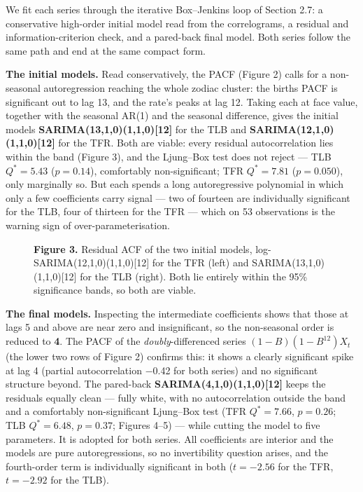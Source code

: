 \documentclass[
  11pt,
]{article}
\makeatletter
\newcommand*\pandocbounded[1]{%
  \sbox\pandoc@box{#1}%
  \Gscale@div\@tempa{\textheight}{\dimexpr\ht\pandoc@box+\dp\pandoc@box\relax}%
  \Gscale@div\@tempb{\linewidth}{\wd\pandoc@box}%
  \ifdim\@tempb\p@<\@tempa\p@\let\@tempa\@tempb\fi%
  \ifdim\@tempa\p@<\p@\scalebox{\@tempa}{\usebox\pandoc@box}%
  \else\usebox{\pandoc@box}%
  \fi%
}
\renewcommand*\pandocbounded[1]{%
  \sbox\pandoc@box{#1}%
  \Gscale@div\@tempa{\linewidth}{\wd\pandoc@box}%
  \ifdim\@tempa\p@<\p@\scalebox{\@tempa}{\usebox\pandoc@box}%
  \else\usebox{\pandoc@box}%
  \fi%
}
\makeatother
\begin{document}
We fit each series through the iterative Box--Jenkins loop of Section
2.7: a conservative high-order initial model read from the correlograms,
a residual and information-criterion check, and a pared-back final
model. Both series follow the same path and end at the same compact
form.

\textbf{The initial models.} Read conservatively, the PACF (Figure 2)
calls for a non-seasonal autoregression reaching the whole zodiac
cluster: the births PACF is significant out to lag 13, and the rate's
peaks at lag 12. Taking each at face value, together with the seasonal
AR(1) and the seasonal difference, gives the initial models
\textbf{SARIMA(13,1,0)(1,1,0){[}12{]}} for the TLB and
\textbf{SARIMA(12,1,0)(1,1,0){[}12{]}} for the TFR. Both are viable:
every residual autocorrelation lies within the band (Figure 3), and the
Ljung--Box test does not reject --- TLB \(Q^* = 5.43\) (\(p = 0.14\)),
comfortably non-significant; TFR \(Q^* = 7.81\) (\(p = 0.050\)), only
marginally so. But each spends a long autoregressive polynomial in which
only a few coefficients carry signal --- two of fourteen are
individually significant for the TLB, four of thirteen for the TFR ---
which on 53 observations is the warning sign of over-parameterisation.

\begin{figure}
\centering
\pandocbounded{\includegraphics[keepaspectratio,alt={Figure 3. Residual ACF of the two initial models, log-SARIMA(12,1,0)(1,1,0){[}12{]} for the TFR (left) and SARIMA(13,1,0)(1,1,0){[}12{]} for the TLB (right). Both lie entirely within the 95\% significance bands, so both are viable.}]{figures/fr2_fig3_initial_resid_acf.png}}
\caption{\textbf{Figure 3.} Residual ACF of the two initial models,
log-SARIMA(12,1,0)(1,1,0){[}12{]} for the TFR (left) and
SARIMA(13,1,0)(1,1,0){[}12{]} for the TLB (right). Both lie entirely
within the 95\% significance bands, so both are viable.}
\end{figure}

\textbf{The final models.} Inspecting the intermediate coefficients
shows that those at lags 5 and above are near zero and insignificant, so
the non-seasonal order is reduced to \textbf{4}. The PACF of the
\emph{doubly}-differenced series \((1-B)(1-B^{12})X_t\) (the lower two
rows of Figure 2) confirms this: it shows a clearly significant spike at
lag 4 (partial autocorrelation −0.42 for both series) and no significant
structure beyond. The pared-back \textbf{SARIMA(4,1,0)(1,1,0){[}12{]}}
keeps the residuals equally clean --- fully white, with no
autocorrelation outside the band and a comfortably non-significant
Ljung--Box test (TFR \(Q^* = 7.66\), \(p = 0.26\); TLB \(Q^* = 6.48\),
\(p = 0.37\); Figures 4--5) --- while cutting the model to five
parameters. It is adopted for both series. All coefficients are interior
and the models are pure autoregressions, so no invertibility question
arises, and the fourth-order term is individually significant in both
(\(t = -2.56\) for the TFR, \(t = -2.92\) for the TLB).
\end{document}
